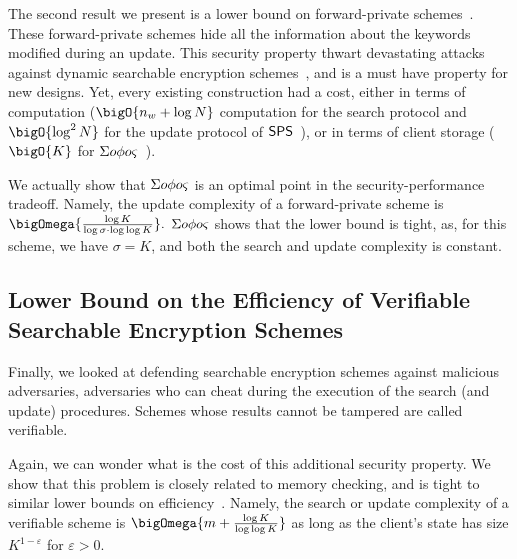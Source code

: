 The second result we present is a lower bound on forward-private schemes~\cite{NDSS:StePapShi14,CCS:Bost16}.
These forward-private schemes hide all the information about the keywords modified during an update.
This security property thwart devastating attacks against dynamic searchable encryption schemes~\cite{USENIX:ZhaKatPap16}, and is a must have property for new designs.
Yet, every existing construction had a cost, either in terms of computation ($\bigO{n_w + \log N}$ computation for the search protocol and $\bigO{\log^2 N}$ for the update protocol of $\mathsf{SPS}$~\cite{NDSS:StePapShi14}), or in terms of client storage ($\bigO{K}$ for ${\Sigma o\phi o\varsigma}$~\cite{CCS:Bost16}).

We actually show that ${\Sigma o\phi o\varsigma}$ is an optimal point in the security-performance tradeoff. Namely, the update complexity of a forward-private scheme is
\(
		\bigOmega{\frac{\log K}{\log \sigma \cdot \log \log  K}}.
\)
${\Sigma o\phi o\varsigma}$ shows that the lower bound is tight, as, for this scheme, we have $\sigma = K$, and both the search and update complexity is constant.


\subsection{Lower Bound on the Efficiency of Verifiable Searchable Encryption Schemes} %
\label{sub:vsse_lb}

Finally, we looked at defending searchable encryption schemes against malicious adversaries, \ie adversaries who can cheat during the execution of the search (and update) procedures. 
Schemes whose results cannot be tampered are called verifiable. 

Again, we can wonder what is the cost of this additional security property.
We show that this problem is closely related to  memory checking, and is tight to similar lower bounds on efficiency~\cite{ICALP:TamTri05,TCC:DNRV09}.
Namely, the search or update complexity of a verifiable scheme is \(\bigOmega{m + \frac{\log K}{\log \log K}}\) as long as the client's state has size $K^{1-\varepsilon}$ for $\varepsilon > 0$. 


